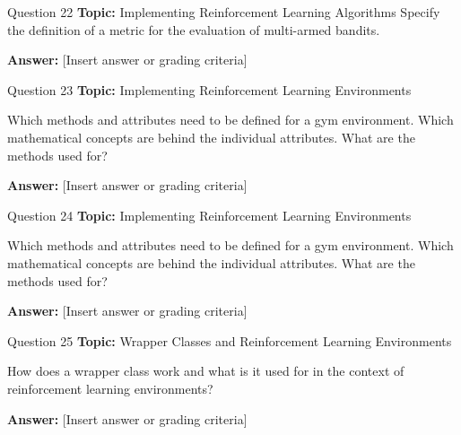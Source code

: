 \begin{frame}{Question 22}
    \textbf{Topic:} Implementing Reinforcement Learning Algorithms
    \vspace{10pt}
    Specify the definition of a metric for the evaluation of multi-armed bandits.
    \vspace{20pt}

    \textbf{Answer:} [Insert answer or grading criteria]
\end{frame}

\begin{frame}{Question 23}
    \textbf{Topic:} Implementing Reinforcement Learning Environments
    
    \vspace{10pt}
    Which methods and attributes need to be defined for a gym environment. Which mathematical concepts are behind the individual attributes. What are the methods used for? 
    \vspace{20pt}

    \textbf{Answer:} [Insert answer or grading criteria]
\end{frame}

\begin{frame}{Question 24}
    \textbf{Topic:} Implementing Reinforcement Learning Environments

    \vspace{10pt}
    Which methods and attributes need to be defined for a gym environment. Which mathematical concepts are behind the individual attributes. What are the methods used for? 
    \vspace{20pt}

    \textbf{Answer:} [Insert answer or grading criteria]
\end{frame}

\begin{frame}{Question 25}
    \textbf{Topic:} Wrapper Classes and Reinforcement Learning Environments

    \vspace{10pt}
    How does a wrapper class work and what is it used for in the context of reinforcement learning environments?   
    \vspace{20pt}

    \textbf{Answer:} [Insert answer or grading criteria]
\end{frame}

